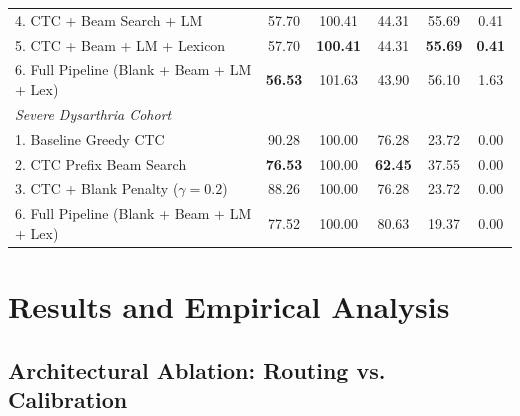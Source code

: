 \documentclass[10pt,twocolumn]{article}
\makeatletter
\newenvironment{adjustbox}[1]{%
  \begin{lrbox}{\@adjbox}%
}{%
  \end{lrbox}%
  \resizebox{\linewidth}{!}{\usebox{\@adjbox}}%
}
\makeatother
\begin{document}
\begin{table}[!t]
\begin{adjustbox}{width=\textwidth}
\begin{tabular}{lccccc}
4. CTC + Beam Search + LM & 57.70 & 100.41 & 44.31 & 55.69 & 0.41 \\
5. CTC + Beam + LM + Lexicon & 57.70 & \textbf{100.41} & 44.31 & \textbf{55.69} & \textbf{0.41} \\
6. Full Pipeline (Blank + Beam + LM + Lex) & \textbf{56.53} & 101.63 & 43.90 & 56.10 & 1.63 \\
\midrule
\multicolumn{6}{l}{\textit{Severe Dysarthria Cohort}} \\
1. Baseline Greedy CTC & 90.28 & 100.00 & 76.28 & 23.72 & 0.00 \\
2. CTC Prefix Beam Search & \textbf{76.53} & 100.00 & \textbf{62.45} & 37.55 & 0.00 \\
3. CTC + Blank Penalty ($\gamma=0.2$) & 88.26 & 100.00 & 76.28 & 23.72 & 0.00 \\
6. Full Pipeline (Blank + Beam + LM + Lex) & 77.52 & 100.00 & 80.63 & 19.37 & 0.00 \\
\bottomrule
\end{tabular}
\end{adjustbox}
\end{table}

\section{Results and Empirical Analysis}

\subsection{Architectural Ablation: Routing vs. Calibration}
\end{document}
